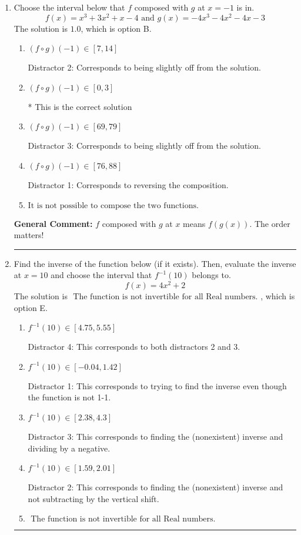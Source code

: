 \documentclass{extbook}[14pt]
\newcommand{\litem}[1]{\item #1

\rule{\textwidth}{0.4pt}}
\begin{document}
\begin{enumerate}\litem{
Choose the interval below that $f$ composed with $g$ at $x=-1$ is in.
\[ f(x) = x^{3} +3 x^{2} +x -4 \text{ and } g(x) = -4x^{3} -4 x^{2} -4 x -3 \]The solution is \( 1.0 \), which is option B.\begin{enumerate}[label=\Alph*.]
\item \( (f \circ g)(-1) \in [7, 14] \)

 Distractor 2: Corresponds to being slightly off from the solution.
\item \( (f \circ g)(-1) \in [0, 3] \)

* This is the correct solution
\item \( (f \circ g)(-1) \in [69, 79] \)

 Distractor 3: Corresponds to being slightly off from the solution.
\item \( (f \circ g)(-1) \in [76, 88] \)

 Distractor 1: Corresponds to reversing the composition.
\item \( \text{It is not possible to compose the two functions.} \)


\end{enumerate}

\textbf{General Comment:} $f$ composed with $g$ at $x$ means $f(g(x))$. The order matters!
}
\litem{
Find the inverse of the function below (if it exists). Then, evaluate the inverse at $x = 10$ and choose the interval that $f^{-1}(10)$ belongs to.
\[ f(x) = 4 x^2 + 2 \]The solution is \( \text{ The function is not invertible for all Real numbers. } \), which is option E.\begin{enumerate}[label=\Alph*.]
\item \( f^{-1}(10) \in [4.75, 5.55] \)

 Distractor 4: This corresponds to both distractors 2 and 3.
\item \( f^{-1}(10) \in [-0.04, 1.42] \)

 Distractor 1: This corresponds to trying to find the inverse even though the function is not 1-1. 
\item \( f^{-1}(10) \in [2.38, 4.3] \)

 Distractor 3: This corresponds to finding the (nonexistent) inverse and dividing by a negative.
\item \( f^{-1}(10) \in [1.59, 2.01] \)

 Distractor 2: This corresponds to finding the (nonexistent) inverse and not subtracting by the vertical shift.
\item \( \text{ The function is not invertible for all Real numbers. } \)


\end{enumerate}}
\end{enumerate}
\end{document}

